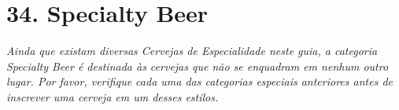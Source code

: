 \section*{34. Specialty Beer}

\textit{Ainda que existam diversas Cervejas de Especialidade neste guia, a categoria Specialty Beer é destinada às cervejas que não se enquadram em nenhum outro lugar. Por favor, verifique cada uma das categorias especiais anteriores antes de inscrever uma cerveja em um desses estilos.}